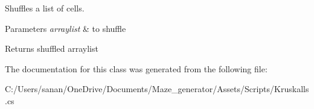 Shuffles a list of cells. 


\begin{DoxyParams}{Parameters}
{\em arraylist} & to shuffle\\
\hline
\end{DoxyParams}
\begin{DoxyReturn}{Returns}
shuffled arraylist 
\end{DoxyReturn}


The documentation for this class was generated from the following file\+:\begin{DoxyCompactItemize}
\item 
C\+:/\+Users/sanan/\+One\+Drive/\+Documents/\+Maze\+\_\+generator/\+Assets/\+Scripts/Kruskalls.\+cs\end{DoxyCompactItemize}
